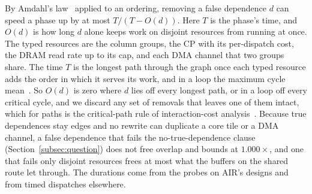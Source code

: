 By Amdahl's law~\citep{amdahl1967validity} applied to an ordering, removing a false dependence $d$ can speed a phase up by at most $T / (T - O(d))$.
Here $T$ is the phase's time, and $O(d)$ is how long $d$ alone keeps work on disjoint resources from running at once.
The typed resources are the column groups, the CP with its per-dispatch cost, the DRAM read rate up to its cap, and each DMA channel that two groups share.
The time $T$ is the longest path through the graph once each typed resource adds the order in which it serves its work, and in a loop the maximum cycle mean~\citep{ghamarian2006throughput}.
So $O(d)$ is zero where $d$ lies off every longest path, or in a loop off every critical cycle, and we discard any set of removals that leaves one of them intact, which for paths is the critical-path rule of interaction-cost analysis~\citep{fields2003interaction}.
Because true dependences stay edges and no rewrite can duplicate a core tile or a DMA channel, a false dependence that fails the no-true-dependence clause (Section~\ref{subsec:question}) does not free overlap and bounds at $1.000\times$, and one that fails only disjoint resources frees at most what the buffers on the shared route let through.
The durations come from the probes on AIR's designs and from timed dispatches elsewhere.

